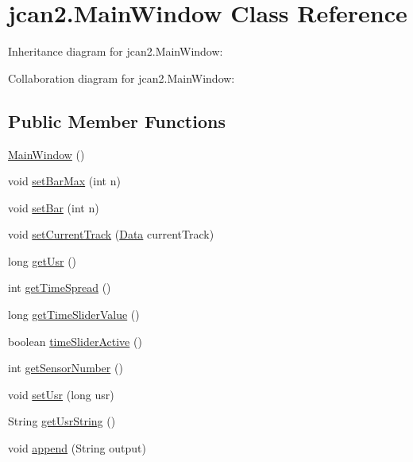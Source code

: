 \hypertarget{classjcan2_1_1_main_window}{}\section{jcan2.\+Main\+Window Class Reference}
\label{classjcan2_1_1_main_window}


Inheritance diagram for jcan2.\+Main\+Window\+:


Collaboration diagram for jcan2.\+Main\+Window\+:
\subsection*{Public Member Functions}
\begin{DoxyCompactItemize}
\item 
\hyperlink{classjcan2_1_1_main_window_a25435c4a13f70aed60aede24913bd721}{Main\+Window} ()
\item 
void \hyperlink{classjcan2_1_1_main_window_ae0312d2aee8e3c81ed9d52f668ccb21e}{set\+Bar\+Max} (int n)
\item 
void \hyperlink{classjcan2_1_1_main_window_ab738cb114b15d6427d82c681fc464a20}{set\+Bar} (int n)
\item 
void \hyperlink{classjcan2_1_1_main_window_aa8ba2ea90e3b63ea7b7311d6722df1af}{set\+Current\+Track} (\hyperlink{classjcan2_1_1_data}{Data} current\+Track)
\item 
long \hyperlink{classjcan2_1_1_main_window_ab6a9c4617391bc8fe841f08c892be7ce}{get\+Usr} ()
\item 
int \hyperlink{classjcan2_1_1_main_window_a6bd8e11c6639e62ede6b6353d3642c1d}{get\+Time\+Spread} ()
\item 
long \hyperlink{classjcan2_1_1_main_window_a5e1b4b017803b0a88e5615660c6c49a6}{get\+Time\+Slider\+Value} ()
\item 
boolean \hyperlink{classjcan2_1_1_main_window_a621c8845895cad76392e92379e2ac830}{time\+Slider\+Active} ()
\item 
int \hyperlink{classjcan2_1_1_main_window_a574826236fa728ad7618a8c44d5aec45}{get\+Sensor\+Number} ()
\item 
void \hyperlink{classjcan2_1_1_main_window_adb4bafa42608ad9a109953451a450881}{set\+Usr} (long usr)
\item 
String \hyperlink{classjcan2_1_1_main_window_af6b8b8fbee6b614e85fdaff84ee3ea16}{get\+Usr\+String} ()
\item 
void \hyperlink{classjcan2_1_1_main_window_a8e4814511884d72149adf0390eca93cd}{append} (String output)

\end{DoxyCompactItemize}
